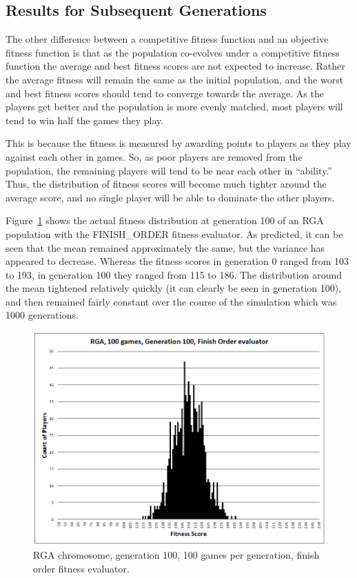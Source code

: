 \subsection{Results for Subsequent Generations}

The other difference between a competitive fitness function and an objective
fitness function is that as the population co-evolves under a competitive
fitness function the average and best fitness scores are not expected to
increase. Rather the average fitness will remain the same as the initial
population, and the worst and best fitness scores should tend to converge
towards the average. As the players get better and the population is more evenly
matched, most players will tend to win half the games they play.

This is because the fitness is measured by awarding points to players as they
play against each other in games. So, as poor players are removed from the
population, the remaining players will tend to be near each other in
``ability.'' Thus, the distribution of fitness scores will become much tighter
around the average score, and no single player will be able to dominate the
other players.

Figure~\ref{figure-100th_gen_fitness} shows the actual fitness distribution at
generation 100 of an RGA population with the FINISH\_ORDER fitness evaluator. As
predicted, it can be seen that the mean remained approximately the same, but the
variance has appeared to decrease. Whereas the fitness scores in generation 0
ranged from 103 to 193, in generation 100 they ranged from 115 to 186. The
distribution around the mean tightened relatively quickly (it can clearly be
seen in generation 100), and then remained fairly constant over the course of
the simulation which was 1000 generations.

\begin{figure}[htp]
\centerline{\includegraphics[width=0.75\columnwidth]{Figures/RGA_1024_G100_N100_FO.png}}
\caption[RGA Fitness Distribution, 100th Generation]{RGA chromosome, generation
100, 100 games per generation, finish order fitness evaluator.}
\label{figure-100th_gen_fitness}
\end{figure}

